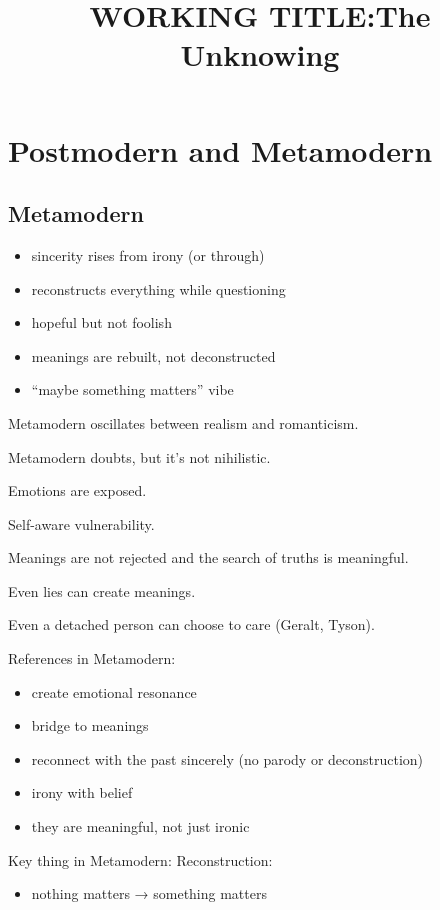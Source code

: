 \documentclass[12pt]{article}
\title{WORKING TITLE:\@ The Unknowing}
\author{}
\date{}
\begin{document}
\maketitle
\tableofcontents

\setcounter{section}{-1}
\section{Postmodern and Metamodern}

\subsection{Metamodern}

\begin{itemize}
  \item sincerity rises from irony (or through)
  \item reconstructs everything while questioning
  \item hopeful but not foolish
  \item meanings are rebuilt, not deconstructed
  \item “maybe something matters” vibe
\end{itemize}

Metamodern oscillates between realism and romanticism.

Metamodern doubts, but it’s not nihilistic.

Emotions are exposed.

Self-aware vulnerability.

Meanings are not rejected and the search of truths is meaningful.

Even lies can create meanings.

Even a detached person can choose to care (Geralt, Tyson).

References in Metamodern:
\begin{itemize}
  \item create emotional resonance
  \item bridge to meanings
  \item reconnect with the past sincerely (no parody or deconstruction)
  \item irony with belief
  \item they are meaningful, not just ironic
\end{itemize}

Key thing in Metamodern: Reconstruction:
\begin{itemize}
  \item nothing matters → something matters
\end{itemize}
\end{document}

